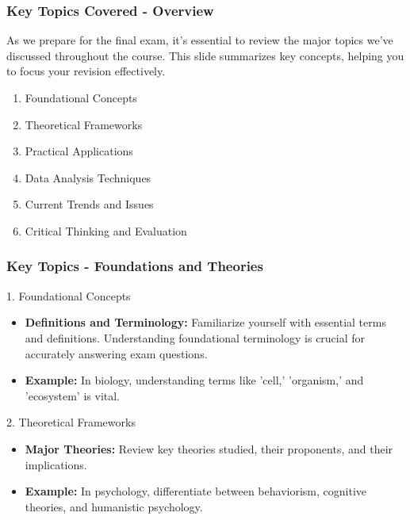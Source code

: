 \documentclass{beamer}
\begin{document}
\begin{frame}[fragile]
    \frametitle{Key Topics Covered - Overview}
    As we prepare for the final exam, it's essential to review the major topics we've discussed throughout the course. This slide summarizes key concepts, helping you to focus your revision effectively.

    \begin{enumerate}
        \item Foundational Concepts
        \item Theoretical Frameworks
        \item Practical Applications
        \item Data Analysis Techniques
        \item Current Trends and Issues
        \item Critical Thinking and Evaluation
    \end{enumerate}
\end{frame}

\begin{frame}[fragile]
    \frametitle{Key Topics - Foundations and Theories}
    \begin{block}{1. Foundational Concepts}
        \begin{itemize}
            \item \textbf{Definitions and Terminology:} Familiarize yourself with essential terms and definitions. Understanding foundational terminology is crucial for accurately answering exam questions.
            \item \textbf{Example:} In biology, understanding terms like 'cell,' 'organism,' and 'ecosystem' is vital.
        \end{itemize}
    \end{block}

    \begin{block}{2. Theoretical Frameworks}
        \begin{itemize}
            \item \textbf{Major Theories:} Review key theories studied, their proponents, and their implications.
            \item \textbf{Example:} In psychology, differentiate between behaviorism, cognitive theories, and humanistic psychology.
        \end{itemize}
    \end{block}
\end{frame}
\end{document}
